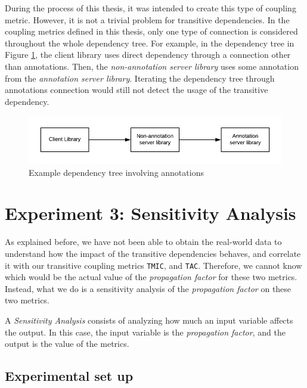 During the process of this thesis, it was intended to create this type of coupling metric. However, it is not a trivial problem for transitive dependencies. In the coupling metrics defined in this thesis, only one type of connection is considered throughout the whole dependency tree. For example, in the dependency tree in Figure \ref{fig:annotation-dependencies}, the client library uses direct dependency through a connection other than annotations. Then, the \textit{non-annotation server library} uses some annotation from the \textit{annotation server library}. Iterating the dependency tree through annotations connection would still not detect the usage of the transitive dependency.

\begin{figure}[ht!]
\begin{center}
\includegraphics[width=\textwidth]{figures/Transitivity-Annotations.png}
\caption{Example dependency tree involving annotations}
\label{fig:annotation-dependencies}
\end{center}
\end{figure}

\section{Experiment 3: Sensitivity Analysis}
As explained before, we have not been able to obtain the real-world data to understand how the impact of the transitive dependencies behaves, and correlate it with our transitive coupling metrics \texttt{TMIC}, and \texttt{TAC}. Therefore, we cannot know which would be the actual value of the \textit{propagation factor} for these two metrics. Instead, what we do is a sensitivity analysis of the \textit{propagation factor} on these two metrics.

A \textit{Sensitivity Analysis} consists of analyzing how much an input variable affects the output. In this case, the input variable is the \textit{propagation factor}, and the output is the value of the metrics.

\subsection{Experimental set up}

